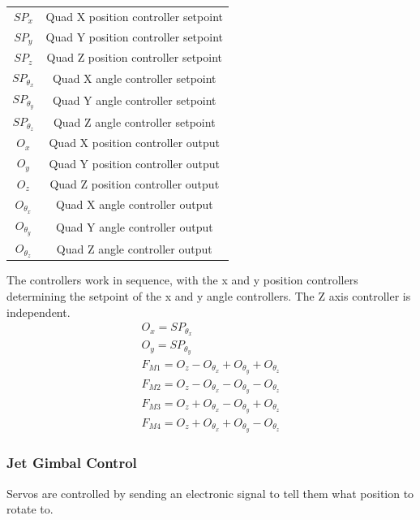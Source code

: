 \documentclass[11pt]{article}
\begin{document}
\begin{center}
\begin{tabular}{cc}
    $SP_x$ & Quad X position controller setpoint \\
    $SP_y$ & Quad Y position controller setpoint \\
    $SP_z$ & Quad Z position controller setpoint \\
    $SP_{\theta_x}$ & Quad X angle controller setpoint \\
    $SP_{\theta_y}$ & Quad Y angle controller setpoint \\
    $SP_{\theta_z}$ & Quad Z angle controller setpoint \\
    $O_x$ & Quad X position controller output \\
    $O_y$ & Quad Y position controller output \\
    $O_z$ & Quad Z position controller output \\
    $O_{\theta_x}$ & Quad X angle controller output \\
    $O_{\theta_y}$ & Quad Y angle controller output \\
    $O_{\theta_z}$ & Quad Z angle controller output \\
\end{tabular}
\end{center}

The controllers work in sequence, with the x and y position controllers determining the setpoint of the x and y angle controllers. The Z axis controller is independent.
\begin{eqnarray}
     O_x = SP_{\theta_x} \nonumber \\
     O_y = SP_{\theta_y} \nonumber \\
     F_{M1} = O_z - O_{\theta_x} + O_{\theta_y} + O_{\theta_z} \label{eqn:FM1} \\
     F_{M2} = O_z - O_{\theta_x} - O_{\theta_y} - O_{\theta_z} \\
     F_{M3} = O_z + O_{\theta_x} - O_{\theta_y} + O_{\theta_z} \\
     F_{M4} = O_z + O_{\theta_x} + O_{\theta_y} - O_{\theta_z} \label{eqn:FM4}
\end{eqnarray}

\subsubsection{Jet Gimbal Control}
Servos are controlled by sending an electronic signal to tell them what position to rotate to.
\end{document}
